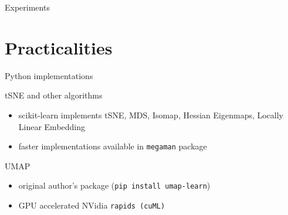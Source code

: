 \documentclass[unknownkeysallowed]{beamer}
\begin{document}
\begin{frame}{Experiments}

\end{frame}

\section{Practicalities}
\begin{frame}{Python implementations}

	\begin{block}{tSNE and other algorithms}
		\begin{itemize}
			\item scikit-learn implements tSNE, MDS, Isomap, Hessian Eigenmaps, Locally Linear Embedding
			\item faster implementations available in \texttt{megaman} package
		\end{itemize}
	\end{block}
	
	\begin{block}{UMAP}
		\begin{itemize}
			\item original author's package (\texttt{pip install umap-learn})
			\item GPU accelerated NVidia \texttt{rapids (cuML)} 
		\end{itemize}
	\end{block}
\end{frame}
\end{document}
